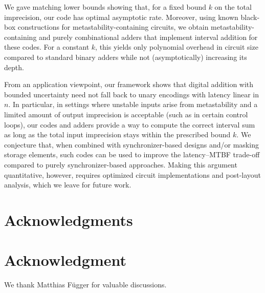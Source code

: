 \documentclass[9pt,journal,compsoc]{IEEEtran}
\theoremstyle{remark}
\begin{document}
We gave matching lower bounds showing that, for a fixed bound $k$ on the total imprecision, our code has optimal asymptotic rate. Moreover, using known black-box constructions for metastability-containing circuits, we obtain metastability-containing and purely combinational adders that implement interval addition for these codes.  For a constant $k$, this yields only polynomial overhead in circuit size compared to standard binary adders while not (asymptotically) increasing its depth.

From an application viewpoint, our framework shows that digital addition with bounded uncertainty need not fall back to unary encodings with latency linear  
in $n$. In particular, in settings where unstable inputs arise from metastability and a limited amount of output imprecision is acceptable (such as in certain control loops), our codes and adders provide a way to compute the
correct interval sum as long as the total input imprecision stays within the prescribed bound $k$. We conjecture that, when combined with synchronizer-based
designs and/or masking storage elements, such codes can be used to improve the latency–MTBF trade-off compared to purely synchronizer-based approaches.
Making this argument quantitative, however, requires optimized  circuit implementations and post-layout analysis, which we leave for future work.


\ifCLASSOPTIONcompsoc
 \section*{Acknowledgments}
\else
 \section*{Acknowledgment}
\fi
We thank Matthias F\"ugger for valuable discussions.

\ifCLASSOPTIONcaptionsoff
  \newpage
\fi



\end{document}
